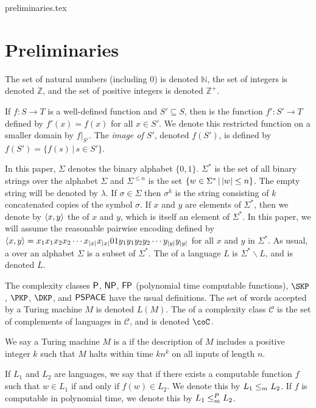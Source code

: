 \begin{filecontents}{preliminaries.tex}
\section{Preliminaries}
\label{sec:preliminaries}

The set of natural numbers (including $0$) is denoted $\mathbb{N}$, the set of integers is denoted $\mathbb{Z}$, and the set of positive integers is denoted $\mathbb{Z}^+$.

If $f\colon S\to T$ is a well-defined function and $S'\subseteq S$, then  is the function $f'\colon S'\to T$ defined by $f'(x)=f(x)$ for all $x\in S'$.
We denote this restricted function on a smaller domain by $f|_{S'}$.
The \emph{image of $S'$}, denoted $f(S')$, is defined by $f(S') = \{f(s) \, | \, s \in S'\}$.

In this paper, $\Sigma$ denotes the binary alphabet $\{0, 1\}$.
$\Sigma^*$ is the set of all binary strings over the alphabet $\Sigma$ and $\Sigma^{\leq n}$ is the set $\lb w\in\Sigma^* \st |w|\leq n \rb$.
The empty string will be denoted by $\lambda$.
If $\sigma\in\Sigma$ then $\sigma^k$ is the string consisting of $k$ concatenated copies of the symbol $\sigma$.
If $x$ and $y$ are elements of $\Sigma^*$, then we denote by $\pair{x}{y}$ the  of $x$ and $y$, which is itself an element of $\Sigma^*$.
In this paper, we will assume the reasonable pairwise encoding defined by $\pair{x}{y}=x_1x_1x_2x_2\cdots x_{|x|}x_{|x|}01y_1y_1y_2y_2\cdots y_{|y|}y_{|y|}$ for all $x$ and $y$ in $\Sigma^*$.
As usual, a  over an alphabet $\Sigma$ is a subset of $\Sigma^*$.
The  of a language $L$ is $\Sigma^*\backslash L$, and is denoted $\overline{L}$.

The complexity classes $\P$, $\NP$, $\FP$ (polynomial time computable functions), $\SKP$, $\PKP$, $\DKP$, and $\PSPACE$ have the usual definitions.
The set of words accepted by a Turing machine $M$ is denoted $L(M)$.
The  of a complexity class $\mathcal{C}$ is the set of complements of languages in $\mathcal{C}$, and is denoted $\coC$.

We say a Turing machine $M$ is a  if the description of $M$ includes a positive integer $k$ such that $M$ halts within time $kn^k$ on all inputs of length $n$.

If $L_1$ and $L_2$ are languages, we say that  if there exists a computable function $f$ such that $w \in L_1$ if and only if $f(w) \in L_2$.
We denote this by $L_1 \mornt L_2$.
If $f$ is computable in polynomial time, we denote this by $L_1 \mor L_2$.


\end{filecontents}

